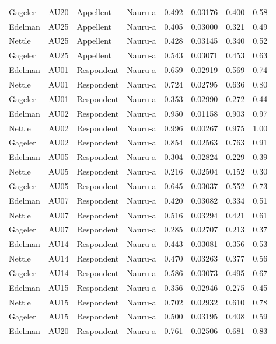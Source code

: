 \documentclass{monashthesis}
\begin{document}
\begin{center}
\begin{longtable}{llllllll}
Gageler & AU20 & Appellent & Nauru-a & 0.492 & 0.03176 & 0.400 & 0.58 \\
Edelman & AU25 & Appellent & Nauru-a & 0.405 & 0.03000 & 0.321 & 0.49 \\
Nettle & AU25 & Appellent & Nauru-a & 0.428 & 0.03145 & 0.340 & 0.52 \\
Gageler & AU25 & Appellent & Nauru-a & 0.543 & 0.03071 & 0.453 & 0.63 \\
Edelman & AU01 & Respondent & Nauru-a & 0.659 & 0.02919 & 0.569 & 0.74 \\
Nettle & AU01 & Respondent & Nauru-a & 0.724 & 0.02795 & 0.636 & 0.80 \\
Gageler & AU01 & Respondent & Nauru-a & 0.353 & 0.02990 & 0.272 & 0.44 \\
Edelman & AU02 & Respondent & Nauru-a & 0.950 & 0.01158 & 0.903 & 0.97 \\
Nettle & AU02 & Respondent & Nauru-a & 0.996 & 0.00267 & 0.975 & 1.00 \\
Gageler & AU02 & Respondent & Nauru-a & 0.854 & 0.02563 & 0.763 & 0.91 \\
Edelman & AU05 & Respondent & Nauru-a & 0.304 & 0.02824 & 0.229 & 0.39 \\
Nettle & AU05 & Respondent & Nauru-a & 0.216 & 0.02504 & 0.152 & 0.30 \\
Gageler & AU05 & Respondent & Nauru-a & 0.645 & 0.03037 & 0.552 & 0.73 \\
Edelman & AU07 & Respondent & Nauru-a & 0.420 & 0.03082 & 0.334 & 0.51 \\
Nettle & AU07 & Respondent & Nauru-a & 0.516 & 0.03294 & 0.421 & 0.61 \\
Gageler & AU07 & Respondent & Nauru-a & 0.285 & 0.02707 & 0.213 & 0.37 \\
Edelman & AU14 & Respondent & Nauru-a & 0.443 & 0.03081 & 0.356 & 0.53 \\
Nettle & AU14 & Respondent & Nauru-a & 0.470 & 0.03263 & 0.377 & 0.56 \\
Gageler & AU14 & Respondent & Nauru-a & 0.586 & 0.03073 & 0.495 & 0.67 \\
Edelman & AU15 & Respondent & Nauru-a & 0.356 & 0.02946 & 0.275 & 0.45 \\
Nettle & AU15 & Respondent & Nauru-a & 0.702 & 0.02932 & 0.610 & 0.78 \\
Gageler & AU15 & Respondent & Nauru-a & 0.500 & 0.03195 & 0.408 & 0.59 \\
Edelman & AU20 & Respondent & Nauru-a & 0.761 & 0.02506 & 0.681 & 0.83 \\

\end{longtable}
\end{center}
\end{document}
